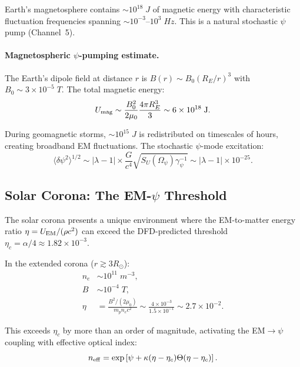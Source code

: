 \documentclass[aps,prd,twocolumn,superscriptaddress,floatfix,nofootinbib]{revtex4-2}
\newcommand{\Opsi}{\Omega_\psi}
\newcommand{\gpsi}{\gamma_\psi}
\newcommand{\lam}{\lambda}
\begin{document}
Earth's magnetosphere contains $\sim 10^{18}\;\si{J}$ of magnetic energy
with characteristic fluctuation frequencies spanning $\sim 10^{-3}$--$10^3\;\si{Hz}$.
This is a natural stochastic $\psi$ pump (Channel~5).

\paragraph{Magnetospheric $\psi$-pumping estimate.}
The Earth's dipole field at distance $r$ is $B(r) \sim B_0(R_E/r)^3$
with $B_0 \sim 3 \times 10^{-5}\;\si{T}$. The total magnetic energy:
\begin{equation}
U_{\rm mag} \sim \frac{B_0^2}{2\mu_0}\frac{4\pi R_E^3}{3}
\sim 6 \times 10^{18}\;\si{J}.
\end{equation}

During geomagnetic storms, $\sim 10^{15}\;\si{J}$ is redistributed on
timescales of hours, creating broadband EM fluctuations. The stochastic
$\psi$-mode excitation:
\begin{equation}
\langle\delta\psi^2\rangle^{1/2} \sim |\lam-1|
\times \frac{G}{c^4}\sqrt{S_U(\Opsi)\gpsi^{-1}}
\sim |\lam-1| \times 10^{-25}.
\end{equation}

\subsection{Solar Corona: The EM-$\psi$ Threshold}\label{sec:solar-corona}

The solar corona presents a unique environment where the EM-to-matter
energy ratio $\eta = U_{\rm EM}/(\rho c^2)$ can exceed the DFD-predicted
threshold $\eta_c = \alpha/4 \approx 1.82 \times 10^{-3}$.

In the extended corona ($r \gtrsim 3 R_\odot$):
\begin{align}
n_e &\sim 10^{11}\;\si{m^{-3}},\\
B &\sim 10^{-4}\;\si{T},\\
\eta &= \frac{B^2/(2\mu_0)}{m_p n_e c^2}
\sim \frac{4\times10^{-3}}{1.5\times10^{-1}}
\sim 2.7 \times 10^{-2}.
\end{align}

This exceeds $\eta_c$ by more than an order of magnitude, activating
the EM$\to\psi$ coupling with effective optical index:
\begin{equation}
n_{\rm eff} = \exp\left[\psi + \kappa(\eta - \eta_c)\Theta(\eta - \eta_c)\right].
\end{equation}
\end{document}
